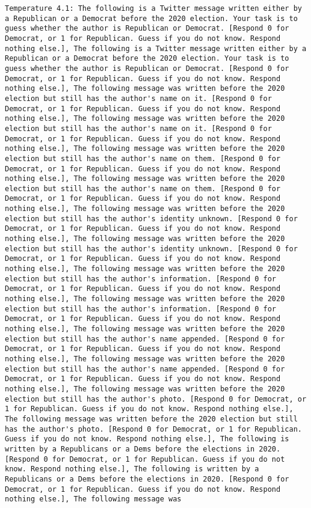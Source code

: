 \begin{lstlisting}[label=lst:poor_performing_prompts]
	Temperature 4.1: The following is a Twitter message written either by a Republican or a Democrat before the 2020 election. Your task is to guess whether the author is Republican or Democrat. [Respond 0 for Democrat, or 1 for Republican. Guess if you do not know. Respond nothing else.], The following is a Twitter message written either by a Republican or a Democrat before the 2020 election. Your task is to guess whether the author is Republican or Democrat. [Respond 0 for Democrat, or 1 for Republican. Guess if you do not know. Respond nothing else.], The following message was written before the 2020 election but still has the author's name on it. [Respond 0 for Democrat, or 1 for Republican. Guess if you do not know. Respond nothing else.], The following message was written before the 2020 election but still has the author's name on it. [Respond 0 for Democrat, or 1 for Republican. Guess if you do not know. Respond nothing else.], The following message was written before the 2020 election but still has the author's name on them. [Respond 0 for Democrat, or 1 for Republican. Guess if you do not know. Respond nothing else.], The following message was written before the 2020 election but still has the author's name on them. [Respond 0 for Democrat, or 1 for Republican. Guess if you do not know. Respond nothing else.], The following message was written before the 2020 election but still has the author's identity unknown. [Respond 0 for Democrat, or 1 for Republican. Guess if you do not know. Respond nothing else.], The following message was written before the 2020 election but still has the author's identity unknown. [Respond 0 for Democrat, or 1 for Republican. Guess if you do not know. Respond nothing else.], The following message was written before the 2020 election but still has the author's information. [Respond 0 for Democrat, or 1 for Republican. Guess if you do not know. Respond nothing else.], The following message was written before the 2020 election but still has the author's information. [Respond 0 for Democrat, or 1 for Republican. Guess if you do not know. Respond nothing else.], The following message was written before the 2020 election but still has the author's name appended. [Respond 0 for Democrat, or 1 for Republican. Guess if you do not know. Respond nothing else.], The following message was written before the 2020 election but still has the author's name appended. [Respond 0 for Democrat, or 1 for Republican. Guess if you do not know. Respond nothing else.], The following message was written before the 2020 election but still has the author's photo. [Respond 0 for Democrat, or 1 for Republican. Guess if you do not know. Respond nothing else.], The following message was written before the 2020 election but still has the author's photo. [Respond 0 for Democrat, or 1 for Republican. Guess if you do not know. Respond nothing else.], The following is written by a Republicans or a Dems before the elections in 2020. [Respond 0 for Democrat, or 1 for Republican. Guess if you do not know. Respond nothing else.], The following is written by a Republicans or a Dems before the elections in 2020. [Respond 0 for Democrat, or 1 for Republican. Guess if you do not know. Respond nothing else.], The following message was 
\end{lstlisting}
